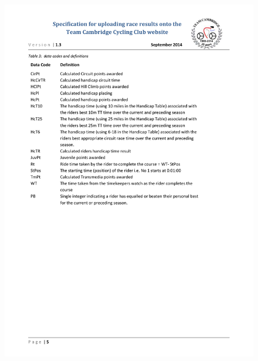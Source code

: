 \begin{figure}[H]
    \includegraphics[width=\textwidth]{./TeamCambridgeSpec/page5.pdf}
\end{figure}

